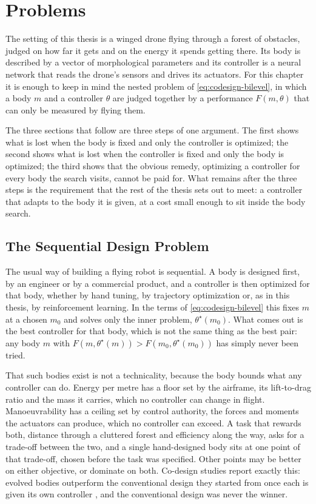 \chapter{Problems}
\label{ch:problems}

The setting of this thesis is a winged drone flying through a forest of obstacles, judged on how far it gets and on the energy it spends getting there. Its body is described by a vector of morphological parameters and its controller is a neural network that reads the drone's sensors and drives its actuators. For this chapter it is enough to keep in mind the nested problem of \eqref{eq:codesign-bilevel}, in which a body $m$ and a controller $\theta$ are judged together by a performance $F(m, \theta)$ that can only be measured by flying them.

The three sections that follow are three steps of one argument. The first shows what is lost when the body is fixed and only the controller is optimized; the second shows what is lost when the controller is fixed and only the body is optimized; the third shows that the obvious remedy, optimizing a controller for every body the search visits, cannot be paid for. What remains after the three steps is the requirement that the rest of the thesis sets out to meet: a controller that adapts to the body it is given, at a cost small enough to sit inside the body search.

\section{The Sequential Design Problem}
\label{sec:problem-sequential}

The usual way of building a flying robot is sequential. A body is designed first, by an engineer or by a commercial product, and a controller is then optimized for that body, whether by hand tuning, by trajectory optimization or, as in this thesis, by reinforcement learning. In the terms of \eqref{eq:codesign-bilevel} this fixes $m$ at a chosen $m_0$ and solves only the inner problem, $\theta^{\star}(m_0)$. What comes out is the best controller for that body, which is not the same thing as the best pair: any body $m$ with $F(m, \theta^{\star}(m)) > F(m_0, \theta^{\star}(m_0))$ has simply never been tried.

That such bodies exist is not a technicality, because the body bounds what any controller can do. Energy per metre has a floor set by the airframe, its lift-to-drag ratio and the mass it carries, which no controller can change in flight. Manoeuvrability has a ceiling set by control authority, the forces and moments the actuators can produce, which no controller can exceed. A task that rewards both, distance through a cluttered forest and efficiency along the way, asks for a trade-off between the two, and a single hand-designed body sits at one point of that trade-off, chosen before the task was specified. Other points may be better on either objective, or dominate on both. Co-design studies report exactly this: evolved bodies outperform the conventional design they started from once each is given its own controller \cite{gupta2021embodied, muff2026hexacopters, bergonti2024codesign}, and the conventional design was never the winner.

